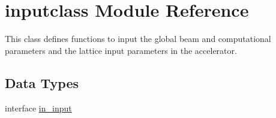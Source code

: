\hypertarget{namespaceinputclass}{}\section{inputclass Module Reference}
\label{namespaceinputclass}


This class defines functions to input the global beam and computational parameters and the lattice input parameters in the accelerator.  


\subsection*{Data Types}
\begin{DoxyCompactItemize}
\item 
interface \mbox{\hyperlink{interfaceinputclass_1_1in__input}{in\+\_\+input}}
\end{DoxyCompactItemize}
